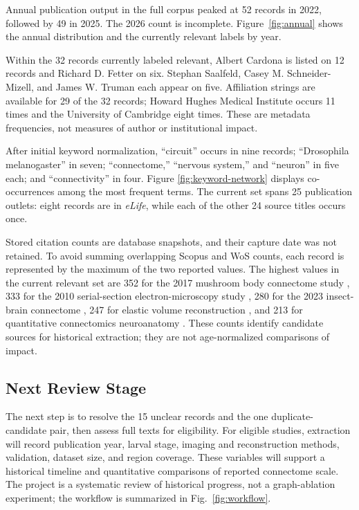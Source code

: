 \documentclass[conference]{IEEEtran}
\begin{document}
Annual publication output in the full corpus peaked at 52 records in 2022,
followed by 49 in 2025. The 2026 count is incomplete. Figure~\ref{fig:annual}
shows the annual distribution and the currently relevant labels by year.

Within the 32 records currently labeled relevant, Albert Cardona is listed
on 12 records and Richard D. Fetter on six. Stephan Saalfeld,
Casey M. Schneider-Mizell, and James W. Truman each appear on five.
Affiliation strings are available for 29 of the 32 records; Howard Hughes
Medical Institute occurs 11 times and the University of Cambridge eight
times. These are metadata frequencies, not measures of author or
institutional impact.

After initial keyword normalization, ``circuit'' occurs in nine records;
``Drosophila melanogaster'' in seven; ``connectome,'' ``nervous system,''
and ``neuron'' in five each; and ``connectivity'' in four. Figure
\ref{fig:keyword-network} displays co-occurrences among the most frequent
terms. The current set spans 25 publication outlets: eight records are in
\textit{eLife}, while each of the other 24 source titles occurs once.

Stored citation counts are database snapshots, and their capture date was
not retained. To avoid summing overlapping Scopus and WoS counts, each
record is represented by the maximum of the two reported values. The
highest values in the current relevant set are 352 for the 2017 mushroom
body connectome study \cite{eichler2017}, 333 for the 2010 serial-section
electron-microscopy study \cite{cardona2010}, 280 for the 2023 insect-brain
connectome \cite{winding2023}, 247 for elastic volume reconstruction
\cite{saalfeld2012}, and 213 for quantitative connectomics neuroanatomy
\cite{schneidermizell2016}. These counts identify candidate sources for
historical extraction; they are not age-normalized comparisons of impact.

\subsection{Next Review Stage}

The next step is to resolve the 15 unclear records and the one
duplicate-candidate pair, then assess full texts for eligibility. For
eligible studies, extraction will record publication year, larval stage,
imaging and reconstruction methods, validation, dataset size, and region
coverage. These variables will support a historical timeline and
quantitative comparisons of reported connectome scale. The project is a
systematic review of historical progress, not a graph-ablation experiment;
the workflow is summarized in Fig.~\ref{fig:workflow}.
\end{document}

